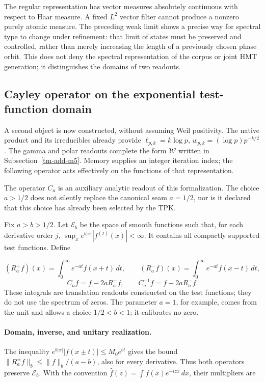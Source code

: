 The regular representation has vector measures absolutely continuous with respect to Haar measure. A fixed \(L^2\) vector filter cannot produce a nonzero purely atomic measure. The preceding weak limit shows a precise way for spectral type to change under refinement: that limit of states must be preserved and controlled, rather than merely increasing the length of a previously chosen phase orbit. This does not deny the spectral representation of the corpus or joint HMT generation; it distinguishes the domains of two readouts.


\subsection{Cayley operator on the exponential test-function domain}
\label{tm-add-m4}
A second object is now constructed, without assuming Weil positivity. The native product and its irreducibles already provide \(\ell_{p,k}=k\log p\), \(w_{p,k}=(\log p)p^{-k/2}\). The gamma and polar readouts complete the form \(\mathscr W\) written in Subsection~\ref{tm-add-m5}. Memory supplies an integer iteration index; the following operator acts effectively on the functions of that representation.

The operator \(C_a\) is an auxiliary analytic readout of this formalization. The choice \(a>1/2\) does not silently replace the canonical seam \(a=1/2\), nor is it declared that this choice has already been selected by the TPK.

Fix \(a>b>1/2\). Let \(\mathscr E_b\) be the space of smooth functions such that, for each derivative order \(j\), \(\sup_x e^{b|x|}|f^{(j)}(x)|<\infty\). It contains all compactly supported test functions. Define

\[
(R_a^+f)(x)=\int_0^\infty e^{-at}f(x+t)\,dt,
\qquad
(R_a^-f)(x)=\int_0^\infty e^{-at}f(x-t)\,dt,
\]
\[
\boxed{C_af=f-2aR_a^+f,\qquad C_a^{-1}f=f-2aR_a^-f.}
\]
These integrals are translation readouts constructed on the test functions; they do not use the spectrum of zeros. The parameter \(a=1\), for example, comes from the unit and allows a choice \(1/2<b<1\); it calibrates no zero.

\paragraph{Domain, inverse, and unitary realization.} The inequality \(e^{b|x|}|f(x\pm t)|\le M_0e^{bt}\) gives the bound \(\|R_a^\pm f\|_b\le\|f\|_b/(a-b)\), also for every derivative. Thus both operators preserve \(\mathscr E_b\). With the convention \(\widehat f(z)=\int f(x)e^{-izx}\,dx\), their multipliers are

